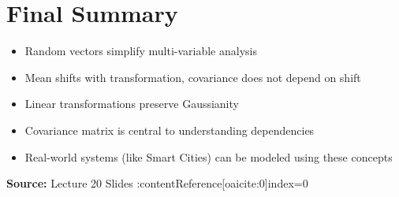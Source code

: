\documentclass[12pt]{article}
\begin{document}
\section*{Final Summary}
\begin{itemize}
    \item Random vectors simplify multi-variable analysis
    \item Mean shifts with transformation, covariance does not depend on shift
    \item Linear transformations preserve Gaussianity
    \item Covariance matrix is central to understanding dependencies
    \item Real-world systems (like Smart Cities) can be modeled using these concepts
\end{itemize}

\vspace{0.5cm}
\noindent \textbf{Source:} Lecture 20 Slides :contentReference[oaicite:0]{index=0}
\end{document}
